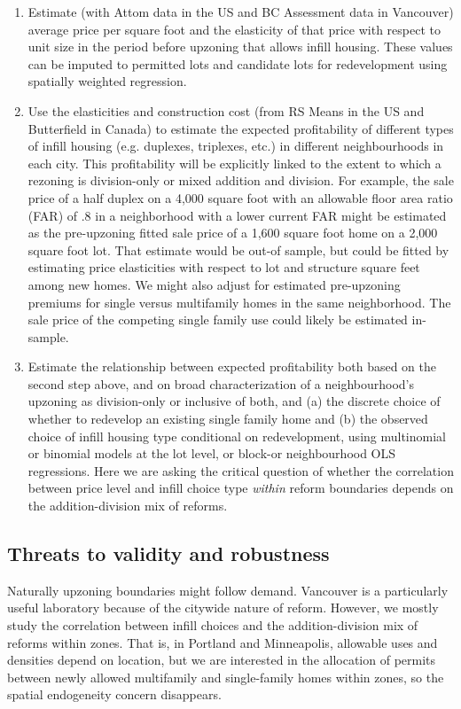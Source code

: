 \documentclass[12pt]{article}
\begin{document}
\begin{enumerate}
	\item Estimate (with Attom data in the US and BC Assessment data in Vancouver) average price per square foot and the elasticity of that price with respect to unit size in the period before upzoning that allows infill housing. These values can be imputed to permitted lots and candidate lots for redevelopment using spatially weighted regression.
	\item Use the elasticities and construction cost (from RS Means in the US and Butterfield in Canada) to estimate the expected profitability of different types of infill housing (e.g. duplexes, triplexes, etc.) in different neighbourhoods in each city. This profitability will be explicitly linked to the extent to which a rezoning is division-only or mixed addition and division. For example, the sale price of a half duplex on a 4,000 square foot with an allowable floor area ratio (FAR) of .8 in a neighborhood with a lower current FAR might be estimated as the pre-upzoning fitted sale price of a 1,600 square foot home on a 2,000 square foot lot. That estimate would be out-of sample, but could be fitted by estimating price elasticities with respect to lot and structure square feet among new homes. We might also adjust for estimated pre-upzoning premiums for single versus multifamily homes in the same neighborhood. The sale price of the competing single family use could likely be estimated in-sample. 
	\item Estimate the relationship between expected profitability both based on the second step above, and on broad characterization of a neighbourhood's upzoning as division-only or inclusive of both, and (a) the discrete choice of whether to redevelop an existing single family home and (b) the observed choice of infill housing type conditional on redevelopment, using multinomial or binomial models at the lot level, or block-or neighbourhood OLS regressions. Here we are asking the critical question of whether the correlation between price level and infill choice type \emph{within} reform boundaries depends on the addition-division mix of reforms.
\end{enumerate}

\subsection{Threats to validity and robustness}

Naturally upzoning boundaries might follow demand. Vancouver is a particularly useful laboratory because of the citywide nature of reform. However, we mostly study the correlation between infill choices and the addition-division mix of reforms within zones. That is, in Portland and Minneapolis, allowable uses and densities depend on location, but we are interested in the allocation of permits between newly allowed multifamily and single-family homes within zones, so the spatial endogeneity concern disappears. 
\end{document}
